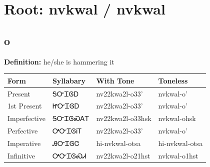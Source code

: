 \documentclass{article}%
\begin{document}
%
\normalsize%
\section*{Root: nvkwal / nvkwal}%
\subsection*{o}%
\textbf{Definition: }%
he/she is hammering it%
\\[0.5em]%
\begin{tabular}{|l|l|l|l|}%
\hline%
\textbf{Form}&\textbf{Syllabary}&\textbf{With Tone}&\textbf{Toneless}\\%
\hline%
Present&ᎦᏅᏆᎶᎠ&nv22kwa2l{-}o33'&nvkwal{-}o'\\%
1st Present&ᏥᏅᏆᎶᎠ&nv22kwa2l{-}o33'&nvkwal{-}o'\\%
Imperfective&ᎦᏅᏆᎶᏍᎪᎢ&nv22kwa2l{-}o33hsk&nvkwal{-}ohsk\\%
Perfective&ᎤᏅᏆᎶᎥᎢ&nv22kwa2l{-}o33'&nvkwal{-}o'\\%
Imperative&ᎯᏅᏆᎶᏣ&hi{-}nvkwal{-}otsa&hi{-}nvkwal{-}otsa\\%
Infinitive&ᎤᏅᏆᎶᏍᏗ&nv22kwa2l{-}o21hst&nvkwal{-}o1hst\\%
\hline%
\end{tabular}%
\\[1em]%
\end{document}
